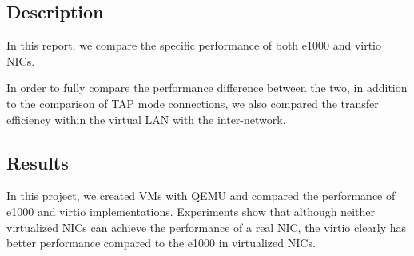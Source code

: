 \subsection*{Description}

In this report, we compare the specific performance of both e1000 and virtio NICs.

In order to fully compare the performance difference between the two, in addition to the comparison of TAP mode connections, we also compared the transfer efficiency within the virtual LAN with the inter-network.

\subsection*{Results}

In this project, we created VMs with QEMU and compared the performance of e1000 and virtio implementations. Experiments show that although neither virtualized NICs can achieve the performance of a real NIC, the virtio clearly has better performance compared to the e1000 in virtualized NICs.
